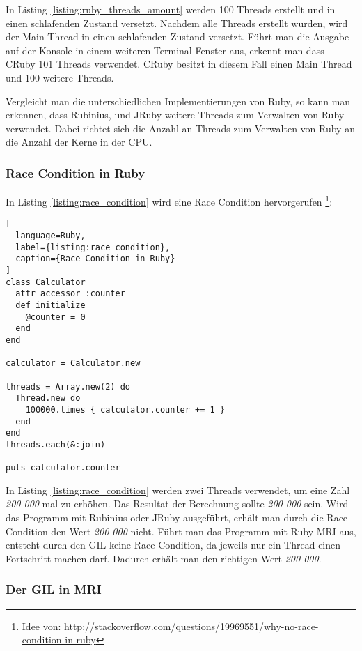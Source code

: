 In Listing \ref{listing:ruby_threads_amount} werden 100 Threads erstellt und in einen schlafenden Zustand versetzt. Nachdem alle Threads erstellt wurden, wird der Main Thread in einen schlafenden Zustand versetzt. Führt man die Ausgabe auf der Konsole in einem weiteren Terminal Fenster aus, erkennt man dass CRuby 101 Threads verwendet. CRuby besitzt in diesem Fall einen Main Thread und 100 weitere Threads.

Vergleicht man die unterschiedlichen Implementierungen von Ruby, so kann man erkennen, dass Rubinius, und JRuby weitere Threads zum Verwalten von Ruby verwendet. Dabei richtet sich die Anzahl an Threads zum Verwalten von Ruby an die Anzahl der Kerne in der CPU.

\subsubsection{Race Condition in Ruby}

In Listing \ref{listing:race_condition} wird eine Race Condition hervorgerufen \footnote{Idee von: \url{http://stackoverflow.com/questions/19969551/why-no-race-condition-in-ruby}}: 

\begin{lstlisting}[
  language=Ruby,
  label={listing:race_condition},
  caption={Race Condition in Ruby}
]
class Calculator
  attr_accessor :counter
  def initialize
    @counter = 0
  end
end

calculator = Calculator.new

threads = Array.new(2) do
  Thread.new do
    100000.times { calculator.counter += 1 }
  end
end
threads.each(&:join)

puts calculator.counter

\end{lstlisting}

In Listing \ref{listing:race_condition} werden zwei Threads verwendet, um eine Zahl \emph{200 000} mal zu erhöhen. Das Resultat der Berechnung sollte \emph{200 000} sein. Wird das Programm mit Rubinius oder JRuby ausgeführt, erhält man durch die Race Condition den Wert \emph{200 000} nicht. Führt man das Programm mit Ruby MRI aus, entsteht durch den GIL keine Race Condition, da jeweils nur ein Thread einen Fortschritt machen darf. Dadurch erhält man den richtigen Wert \emph{200 000}.

\subsubsection{Der GIL in MRI}

